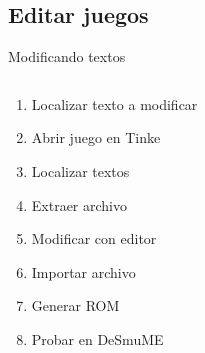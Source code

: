 \subsection{Editar juegos}
\begin{frame}{Modificando textos}
    \begin{columns}
    \begin{column}{0.5\textwidth}
        \begin{enumerate}
            \item<1-> Localizar texto a modificar
            \item<2-> Abrir juego en Tinke
            \item<3-> Localizar textos
            \item<4-> Extraer archivo
            \item<5-> Modificar con editor
            \item<6-> Importar archivo
            \item<7-> Generar ROM
            \item<8-> Probar en DeSmuME
        \end{enumerate}
    \end{column}
    \hfill
    \begin{column}{0.5\textwidth}
        \centering

\end{column}
\end{columns}
\end{frame}
